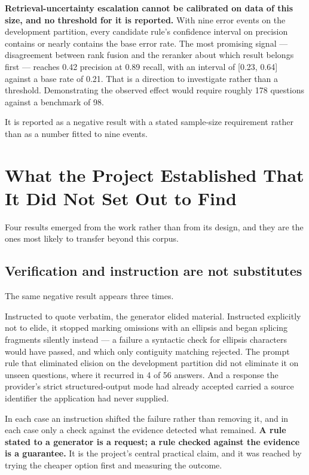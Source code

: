 \textbf{Retrieval-uncertainty escalation cannot be calibrated on data of this
size, and no threshold for it is reported.} With nine error events on the development
partition, every candidate rule's confidence interval on precision contains or
nearly contains the base error rate. The most promising signal --- disagreement
between rank fusion and the reranker about which result belongs first --- reaches
0.42 precision at 0.89 recall, with an interval of [0.23, 0.64] against a base
rate of 0.21. That is a direction to investigate rather than a threshold. Demonstrating the
observed effect would require roughly 178 questions against a benchmark of 98.

It is reported as a negative result with a stated sample-size requirement
rather than as a number fitted to nine events.

\section{What the Project Established That It Did Not Set Out to Find}

Four results emerged from the work rather than from its design, and they are the
ones most likely to transfer beyond this corpus.

\subsection{Verification and instruction are not substitutes}

The same negative result appears three times.

Instructed to quote verbatim, the generator elided material. Instructed
explicitly not to elide, it stopped marking omissions with an ellipsis and began
splicing fragments silently instead --- a failure a syntactic check for ellipsis
characters would have passed, and which only contiguity matching rejected. The
prompt rule that eliminated elision on the development partition did not
eliminate it on unseen questions, where it recurred in 4 of 56 answers. And a
response the provider's strict structured-output mode had already accepted
carried a source identifier the application had never supplied.

In each case an instruction shifted the failure rather than removing it, and in
each case only a check against the evidence detected what remained.
\textbf{A rule stated to a generator is a request; a rule checked against the
evidence is a guarantee.} It is the project's central practical claim, and it was reached by trying the
cheaper option first and measuring the outcome.

